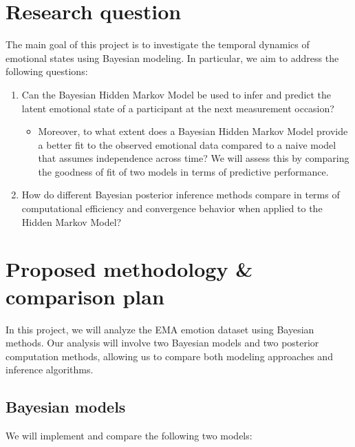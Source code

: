 \documentclass[a4paper,11pt]{article}
\begin{document}
\section{Research question}

The main goal of this project is to investigate the temporal dynamics of emotional states using Bayesian modeling. In particular, we aim to address the following questions:

\begin{enumerate}
    \item Can the Bayesian Hidden Markov Model be used to infer and predict the latent emotional state of a participant at the next measurement occasion?
    \begin{itemize}
            \item Moreover, to what extent does a Bayesian Hidden Markov Model provide a better fit to the observed emotional data compared to a naive model that assumes independence across time? We will assess this by comparing the goodness of fit of two models in terms of predictive performance. 
    \end{itemize}

    \item How do different Bayesian posterior inference methods compare in terms of computational efficiency and convergence behavior when applied to the Hidden Markov Model?
\end{enumerate}
\section{Proposed methodology \& comparison plan}

In this project, we will analyze the EMA emotion dataset using Bayesian methods. 
Our analysis will involve two Bayesian models and two posterior computation methods, 
allowing us to compare both modeling approaches and inference algorithms.

\subsection{Bayesian models}

We will implement and compare the following two models:
\end{document}
